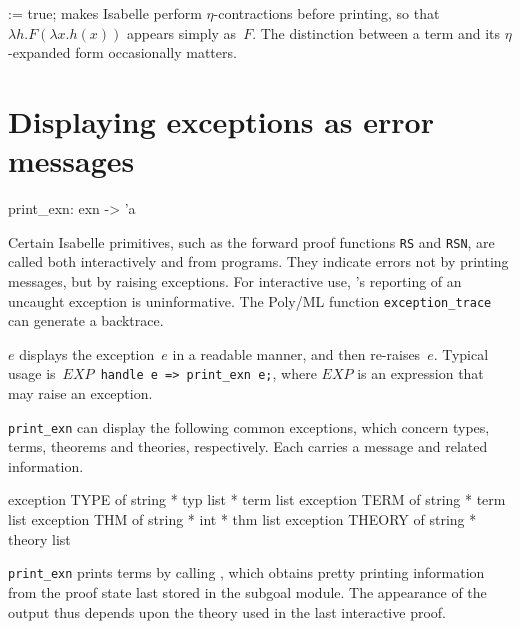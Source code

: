 \begin{ttdescription}
\item[\ttindexbold{eta_contract} := true;]
makes Isabelle perform $\eta$-contractions before printing, so that
$\lambda h.F(\lambda x.h(x))$ appears simply as~$F$.  The
distinction between a term and its $\eta$-expanded form occasionally
matters.
\end{ttdescription}


\section{Displaying exceptions as error messages}
\begin{ttbox} 
print_exn: exn -> 'a
\end{ttbox}
Certain Isabelle primitives, such as the forward proof functions {\tt RS}
and {\tt RSN}, are called both interactively and from programs.  They
indicate errors not by printing messages, but by raising exceptions.  For
interactive use, \ML's reporting of an uncaught exception is 
uninformative.  The Poly/ML function {\tt exception_trace} can generate a
backtrace.

\begin{ttdescription}
\item[\ttindexbold{print_exn} $e$] 
displays the exception~$e$ in a readable manner, and then re-raises~$e$.
Typical usage is~\hbox{\tt $EXP$ handle e => print_exn e;}, where
$EXP$ is an expression that may raise an exception.

{\tt print_exn} can display the following common exceptions, which concern
types, terms, theorems and theories, respectively.  Each carries a message
and related information.
\begin{ttbox} 
exception TYPE   of string * typ list * term list
exception TERM   of string * term list
exception THM    of string * int * thm list
exception THEORY of string * theory list
\end{ttbox}
\end{ttdescription}
\begin{warn}
  {\tt print_exn} prints terms by calling , which obtains
  pretty printing information from the proof state last stored in the
  subgoal module.  The appearance of the output thus depends upon the
  theory used in the last interactive proof.
\end{warn}

